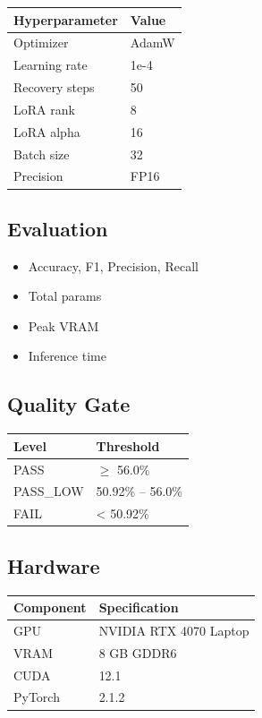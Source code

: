 \begin{table}[H]
\centering
\small
\begin{tabular}{ll}
\toprule
\textbf{Hyperparameter} & \textbf{Value} \\
\midrule
Optimizer & AdamW \\
Learning rate & 1e-4 \\
Recovery steps & 50 \\
LoRA rank & 8 \\
LoRA alpha & 16 \\
Batch size & 32 \\
Precision & FP16 \\
\bottomrule
\end{tabular}
\end{table}

\subsection{Evaluation}

\begin{itemize}
\item Accuracy, F1, Precision, Recall
\item Total params
\item Peak VRAM
\item Inference time

\end{itemize}
\subsection{Quality Gate}

\begin{table}[H]
\centering
\small
\begin{tabular}{ll}
\toprule
\textbf{Level} & \textbf{Threshold} \\
\midrule
PASS & $\ge$ 56.0\% \\
PASS\_LOW & 50.92\% -- 56.0\% \\
FAIL & \textless{} 50.92\% \\
\bottomrule
\end{tabular}
\end{table}

\subsection{Hardware}

\begin{table}[H]
\centering
\small
\begin{tabular}{ll}
\toprule
\textbf{Component} & \textbf{Specification} \\
\midrule
GPU & NVIDIA RTX 4070 Laptop \\
VRAM & 8 GB GDDR6 \\
CUDA & 12.1 \\
PyTorch & 2.1.2 \\
\bottomrule
\end{tabular}
\end{table}

